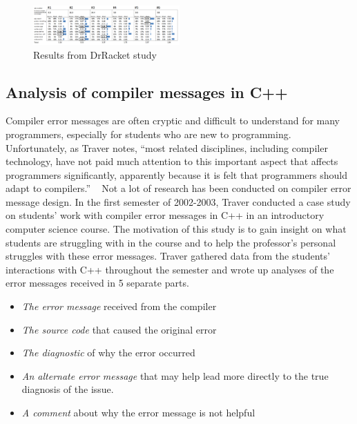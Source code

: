 \documentclass{sig-alternate}
\begin{document}

\begin{figure}[t!]
  \centering
  \includegraphics[keepaspectratio, width=0.5\textwidth]{MEE_Data.png}
  \caption{Results from DrRacket study}
  \label{fig:drracketstudy}
\end{figure}


\subsection{Analysis of compiler messages in C++}\label{subsec:compiler analysis}
Compiler error messages are often cryptic and difficult to understand for many programmers, especially for students who are new to programming.
Unfortunately, as Traver notes, ``most related disciplines, including compiler technology, have not paid much attention to this important aspect that affects programmers significantly, apparently because it is felt that programmers should adapt to compilers.'' ~\cite{Traver:2010}
Not a lot of research has been conducted on compiler error message design.
In the first semester of 2002-2003, Traver conducted a case study on students' work with compiler error messages in C++ in an introductory computer science course.
The motivation of this study is to gain insight on what students are struggling with in the course and to help the professor's personal struggles with these error messages.
Traver gathered data from the students' interactions with C++ throughout the semester and wrote up analyses of the error messages received in 5 separate parts.
\begin{itemize}
	\item \textit{The error message} received from the compiler
	\item \textit{The source code} that caused the original error
	\item \textit{The diagnostic} of why the error occurred
	\item \textit{An alternate error message} that may help lead more directly to the true diagnosis of the issue.
	\item \textit{A comment} about why the error message is not helpful
\end{itemize}
\end{document}
